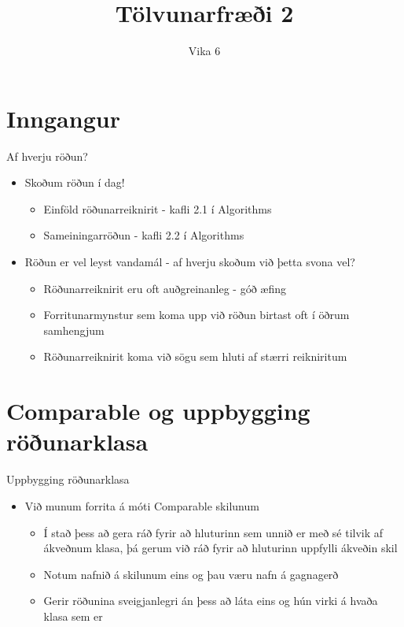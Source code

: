 \documentclass{beamer}
\title{Tölvunarfræði 2}
\subtitle{Vika 6}
\begin{document}
\begin{frame}
	\titlepage
\end{frame}

\section{Inngangur}

\begin{frame}{Af hverju röðun?}
	\begin{itemize}
		\item Skoðum röðun í dag!
		      \begin{itemize}
			      \item Einföld röðunarreiknirit - kafli 2.1 í Algorithms
			      \item Sameiningarröðun - kafli 2.2 í Algorithms
		      \end{itemize}
		\item Röðun er vel leyst vandamál - af hverju skoðum við þetta svona vel?
		      \begin{itemize}
			      \item Röðunarreiknirit eru oft auðgreinanleg - góð æfing
			      \item Forritunarmynstur sem koma upp við röðun birtast oft í öðrum samhengjum
			      \item Röðunarreiknirit koma við sögu sem hluti af stærri reikniritum
		      \end{itemize}
	\end{itemize}
\end{frame}

\section{Comparable og uppbygging röðunarklasa}

\begin{frame}{Uppbygging röðunarklasa}
	\begin{itemize}
		\item Við munum forrita á móti Comparable skilunum
		      \begin{itemize}
			      \item Í stað þess að gera ráð fyrir að hluturinn sem unnið er með sé tilvik af ákveðnum klasa, þá gerum við ráð fyrir að hluturinn uppfylli ákveðin skil
			      \item Notum nafnið á skilunum eins og þau væru nafn á gagnagerð
			      \item Gerir röðunina sveigjanlegri án þess að láta eins og hún virki á hvaða klasa sem er
		      \end{itemize}
	\end{itemize}
\end{frame}
\end{document}
